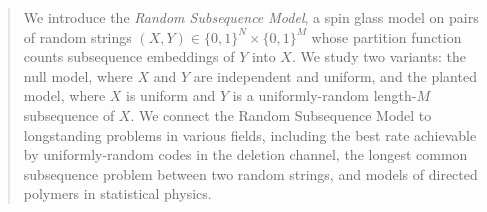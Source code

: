 \documentclass[11pt]{amsart}
\numberwithin{equation}{section}
\numberwithin{equation}{section}
\newcommand{\1}{\mathbbm{1}}
\theoremstyle{definition}
\begin{document}
\begin{abstract}





    We introduce the \textit{Random Subsequence Model}, a spin glass model on pairs of random strings $(X,Y) \in \{0,1\}^N \times \{0,1\}^M$ whose partition function counts subsequence embeddings of $Y$ into $X$. We study two variants: the null model, where $X$ and $Y$ are independent and uniform, and the planted model, where $X$ is uniform and $Y$ is a uniformly-random length-$M$ subsequence of $X$. We connect the Random Subsequence Model to longstanding problems in various fields, including the best rate achievable by uniformly-random codes in the deletion channel, the longest common subsequence problem between two random strings, and models of directed polymers in statistical physics.


\end{abstract}
\end{document}
